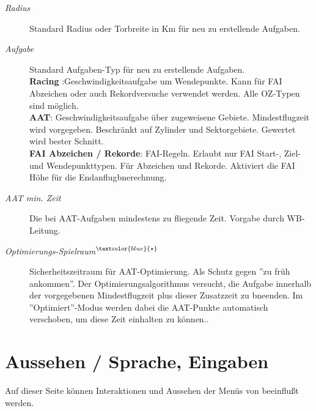 \begin{description}
\item[\textit{Radius}] Standard Radius oder Torbreite in Km für neu zu erstellende Aufgaben.
\item[\textit{Aufgabe}] Standard Aufgaben-Typ für neu zu erstellende Aufgaben.\\
{\bf Racing }:Geschwindigkeitsaufgabe um Wendepunkte. Kann für FAI Abzeichen oder auch Rekordversuche  verwendet werden. Alle OZ-Typen sind möglich.\\
{\bf  AAT}: Geschwindigkeitsaufgabe über zugeweisene Gebiete. Mindestflugzeit wird vorgegeben. Beschränkt auf Zylinder und Sektorgebiete. Gewertet wird bester Schnitt.\\
{\bf  FAI Abzeichen / Rekorde}: FAI-Regeln. Erlaubt nur FAI Start-, Ziel- und Wendepunkttypen. Für Abzeichen und Rekorde. Aktiviert die FAI Höhe für die Endanflugbnerechnung.
\item[\textit{AAT min. Zeit}] Die bei AAT-Aufgaben mindestens zu fliegende Zeit. Vorgabe durch WB-Leitung.
\item[\textit{Optimierungs-Spielraum$^{\textcolor{blue}{\star}}$}] Sicherheitszeitraum für AAT-Optimierung.
Als Schutz gegen ''zu früh ankommen''. Der Optimierungsalgorithmus versucht, die Aufgabe innerhalb der vorgegebenen Mindestflugzeit plus dieser Zusatzzeit zu bneenden.
Im ''Optimiert''-Modus  werden dabei die AAT-Punkte automatisch verschoben, um diese Zeit einhalten zu können..
\end{description}


\section{Aussehen / Sprache, Eingaben}\label{sec:interface}

Auf dieser Seite können Interaktionen und Aussehen der Menüs von \xc beeinflußt werden.


